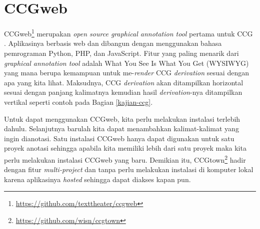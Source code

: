 \section{CCGweb}
CCGweb\footnote{\url{https://github.com/texttheater/ccgweb}} merupakan
\textit{open source graphical annotation tool} pertama untuk CCG \cite{evang-etal-2019-ccgweb}.
Aplikasinya berbasis web dan dibangun dengan menggunakan bahasa pemrograman
Python, PHP, dan JavaScript.
Fitur yang paling menarik dari \textit{graphical annotation tool} adalah What You See Is What
You Get (WYSIWYG) yang mana berupa kemampuan untuk me-\textit{render} CCG \textit{derivation}
sesuai dengan apa yang kita lihat.
Maksudnya, CCG \textit{derivation} akan ditampilkan horizontal sesuai dengan panjang kalimatnya
kemudian hasil \textit{derivation}-nya ditampilkan vertikal seperti contoh pada
Bagian \ref{kajian-ccg}.

Untuk dapat menggunakan CCGweb, kita perlu melakukan instalasi terlebih dahulu.
Selanjutnya barulah kita dapat menambahkan kalimat-kalimat yang ingin dianotasi.
Satu instalasi CCGweb hanya dapat digunakan untuk satu proyek anotasi sehingga
apabila kita memiliki lebih dari satu proyek maka kita perlu melakukan instalasi
CCGweb yang baru.
Demikian itu, CCGtown\footnote{\url{https://github.com/wisn/ccgtown}} hadir dengan
fitur \textit{multi-project} dan tanpa perlu melakukan instalasi di komputer lokal
karena aplikasinya \textit{hosted} sehingga dapat diakses kapan pun.
